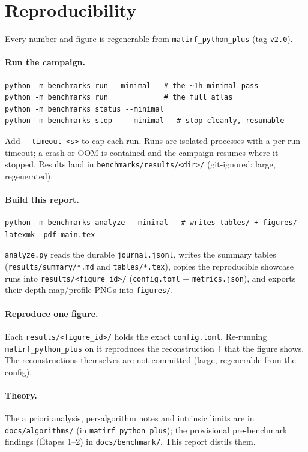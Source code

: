 \section{Reproducibility}
\label{sec:repro}

Every number and figure is regenerable from \texttt{matirf\_python\_plus} (tag \texttt{v2.0}).

\paragraph{Run the campaign.}
\begin{verbatim}
python -m benchmarks run --minimal   # the ~1h minimal pass
python -m benchmarks run             # the full atlas
python -m benchmarks status --minimal
python -m benchmarks stop   --minimal   # stop cleanly, resumable
\end{verbatim}
Add \texttt{-{}-timeout <s>} to cap each run. Runs are isolated processes with a per-run
timeout; a crash or OOM is contained and the campaign
resumes where it stopped. Results land in \texttt{benchmarks/results/<dir>/} (git-ignored: large,
regenerated).

\paragraph{Build this report.}
\begin{verbatim}
python -m benchmarks analyze --minimal   # writes tables/ + figures/
latexmk -pdf main.tex
\end{verbatim}
\texttt{analyze.py} reads the durable \texttt{journal.jsonl}, writes the summary tables
(\texttt{results/summary/*.md} and \texttt{tables/*.tex}), copies the reproducible showcase runs
into \texttt{results/<figure\_id>/} (\texttt{config.toml} + \texttt{metrics.json}), and exports
their depth-map/profile PNGs into \texttt{figures/}.

\paragraph{Reproduce one figure.}
Each \texttt{results/<figure\_id>/} holds the exact \texttt{config.toml}. Re-running
\texttt{matirf\_python\_plus} on it reproduces the reconstruction \texttt{f} that the figure
shows. The reconstructions themselves are not committed (large, regenerable from the config).

\paragraph{Theory.}
The a priori analysis, per-algorithm notes and intrinsic limits are in
\texttt{docs/algorithms/} (in \texttt{matirf\_python\_plus}); the provisional pre-benchmark
findings (Étapes 1--2) in \texttt{docs/benchmark/}. This report distils them.
